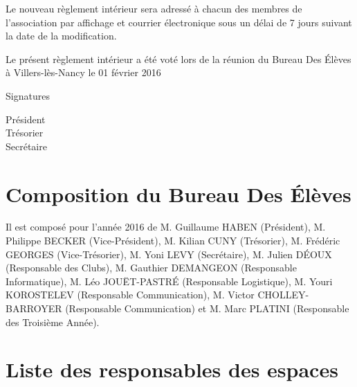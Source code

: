 \documentclass{article} %
\begin{document}
		Le nouveau règlement intérieur sera adressé à chacun des membres de
		l'association par affichage et courrier électronique sous un délai de 7
		jours suivant la date de la modification.

    \vfill
	\begin{center}
		{\large\light Le présent règlement intérieur a été voté lors de la réunion
		du Bureau Des Élèves à Villers-lès-Nancy le 01 février 2016}
	\end{center}
	\vfill
	Signatures\par
	\begin{multicols}{3}
	    \begin{center}
	        Président \\
	        Trésorier \\
	        Secrétaire
	    \end{center}
	\end{multicols}
	\vspace{3cm}
	\clearpage

	\section*{Composition du Bureau Des Élèves}
		
		Il est composé pour l’année 2016 de M. Guillaume HABEN (Président), M.
		Philippe BECKER (Vice-Président), M. Kilian CUNY (Trésorier), M.
		Frédéric GEORGES (Vice-Trésorier), M. Yoni LEVY (Secrétaire), M. Julien
		DÉOUX (Responsable des Clubs), M. Gauthier DEMANGEON (Responsable
		Informatique), M. Léo JOUËT-PASTRÉ (Responsable Logistique), M. Youri
		KOROSTELEV (Responsable Communication), M. Victor CHOLLEY-BARROYER
		(Responsable Communication) et M. Marc PLATINI (Responsable des
		Troisième Année).

	\section*{Liste des responsables des espaces}
\end{document}
